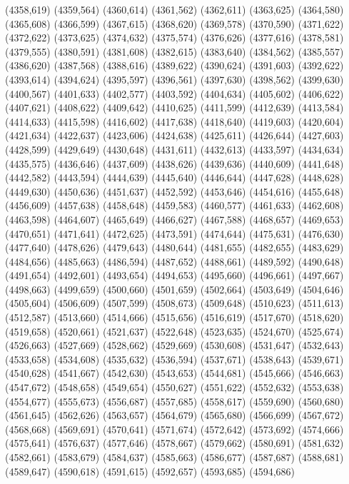 (4358,619)
(4359,564)
(4360,614)
(4361,562)
(4362,611)
(4363,625)
(4364,580)
(4365,608)
(4366,599)
(4367,615)
(4368,620)
(4369,578)
(4370,590)
(4371,622)
(4372,622)
(4373,625)
(4374,632)
(4375,574)
(4376,626)
(4377,616)
(4378,581)
(4379,555)
(4380,591)
(4381,608)
(4382,615)
(4383,640)
(4384,562)
(4385,557)
(4386,620)
(4387,568)
(4388,616)
(4389,622)
(4390,624)
(4391,603)
(4392,622)
(4393,614)
(4394,624)
(4395,597)
(4396,561)
(4397,630)
(4398,562)
(4399,630)
(4400,567)
(4401,633)
(4402,577)
(4403,592)
(4404,634)
(4405,602)
(4406,622)
(4407,621)
(4408,622)
(4409,642)
(4410,625)
(4411,599)
(4412,639)
(4413,584)
(4414,633)
(4415,598)
(4416,602)
(4417,638)
(4418,640)
(4419,603)
(4420,604)
(4421,634)
(4422,637)
(4423,606)
(4424,638)
(4425,611)
(4426,644)
(4427,603)
(4428,599)
(4429,649)
(4430,648)
(4431,611)
(4432,613)
(4433,597)
(4434,634)
(4435,575)
(4436,646)
(4437,609)
(4438,626)
(4439,636)
(4440,609)
(4441,648)
(4442,582)
(4443,594)
(4444,639)
(4445,640)
(4446,644)
(4447,628)
(4448,628)
(4449,630)
(4450,636)
(4451,637)
(4452,592)
(4453,646)
(4454,616)
(4455,648)
(4456,609)
(4457,638)
(4458,648)
(4459,583)
(4460,577)
(4461,633)
(4462,608)
(4463,598)
(4464,607)
(4465,649)
(4466,627)
(4467,588)
(4468,657)
(4469,653)
(4470,651)
(4471,641)
(4472,625)
(4473,591)
(4474,644)
(4475,631)
(4476,630)
(4477,640)
(4478,626)
(4479,643)
(4480,644)
(4481,655)
(4482,655)
(4483,629)
(4484,656)
(4485,663)
(4486,594)
(4487,652)
(4488,661)
(4489,592)
(4490,648)
(4491,654)
(4492,601)
(4493,654)
(4494,653)
(4495,660)
(4496,661)
(4497,667)
(4498,663)
(4499,659)
(4500,660)
(4501,659)
(4502,664)
(4503,649)
(4504,646)
(4505,604)
(4506,609)
(4507,599)
(4508,673)
(4509,648)
(4510,623)
(4511,613)
(4512,587)
(4513,660)
(4514,666)
(4515,656)
(4516,619)
(4517,670)
(4518,620)
(4519,658)
(4520,661)
(4521,637)
(4522,648)
(4523,635)
(4524,670)
(4525,674)
(4526,663)
(4527,669)
(4528,662)
(4529,669)
(4530,608)
(4531,647)
(4532,643)
(4533,658)
(4534,608)
(4535,632)
(4536,594)
(4537,671)
(4538,643)
(4539,671)
(4540,628)
(4541,667)
(4542,630)
(4543,653)
(4544,681)
(4545,666)
(4546,663)
(4547,672)
(4548,658)
(4549,654)
(4550,627)
(4551,622)
(4552,632)
(4553,638)
(4554,677)
(4555,673)
(4556,687)
(4557,685)
(4558,617)
(4559,690)
(4560,680)
(4561,645)
(4562,626)
(4563,657)
(4564,679)
(4565,680)
(4566,699)
(4567,672)
(4568,668)
(4569,691)
(4570,641)
(4571,674)
(4572,642)
(4573,692)
(4574,666)
(4575,641)
(4576,637)
(4577,646)
(4578,667)
(4579,662)
(4580,691)
(4581,632)
(4582,661)
(4583,679)
(4584,637)
(4585,663)
(4586,677)
(4587,687)
(4588,681)
(4589,647)
(4590,618)
(4591,615)
(4592,657)
(4593,685)
(4594,686)
